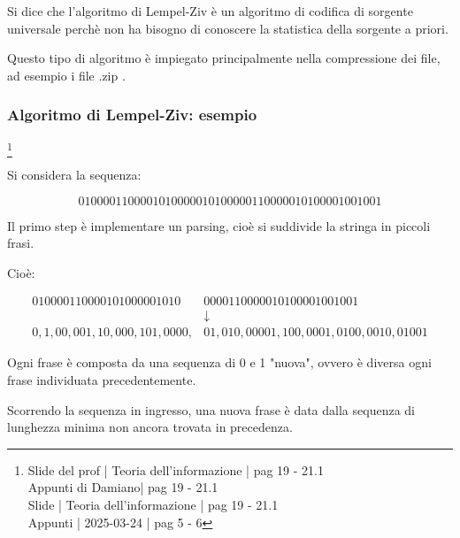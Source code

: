 Si dice che l'algoritmo di Lempel-Ziv è un algoritmo di codifica di sorgente universale perchè non ha bisogno di conoscere la statistica della sorgente a priori. \newline 

Questo tipo di algoritmo è impiegato principalmente nella compressione dei file, ad esempio i file .zip .\newline 

\newpage 

\subsubsection{Algoritmo di Lempel-Ziv: esempio}
\footnote{Slide del prof | Teoria dell'informazione | pag 19 - 21.1\\  
Appunti di Damiano| pag 19 - 21.1\\
Slide | Teoria dell'informazione | pag 19 - 21.1 \\
Appunti | 2025-03-24 | pag 5 - 6
}

Si considera la sequenza: 

{
    \Large
    \begin{equation}
        0100001100001010000010100000110000010100001001001
    \end{equation}
}

Il primo step è implementare un parsing, cioè si suddivide la stringa in piccoli frasi. \newline 

Cioè: 

{
    \Large 
    \begin{equation}
        \begin{split}
           010000110000101000001010&0000110000010100001001001
           \\
           &\downarrow
           \\
           0, 1, 00, 001, 10, 000, 101, 0000, &01, 010, 00001, 100, 0001, 0100, 0010, 01001 
        \end{split}
    \end{equation}
}

Ogni frase è composta da una sequenza di 0 e 1 "nuova", ovvero è diversa ogni frase individuata precedentemente. \newline 

Scorrendo la sequenza in ingresso, 
una nuova frase è data dalla sequenza di lunghezza minima non ancora trovata in precedenza. \newline 

